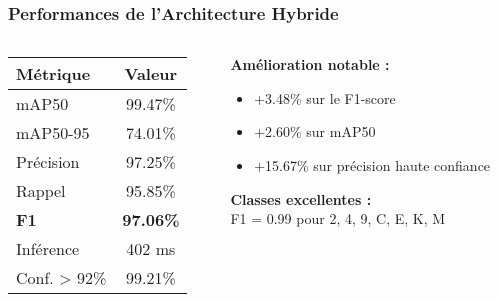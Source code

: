 \documentclass[
	11pt,
	aspectratio=169,
]{beamer}
\begin{document}
\begin{frame}
	\frametitle{Performances de l'Architecture Hybride}
	
	\begin{columns}[c]
		\begin{column}{0.5\textwidth}
			\begin{table}
				\centering
				\begin{tabular}{lc}
					\toprule
					\textbf{Métrique} & \textbf{Valeur} \\
					\midrule
					mAP50 & 99.47\% \\
					mAP50-95 & 74.01\% \\
					Précision & 97.25\% \\
					Rappel & 95.85\% \\
					\textbf{F1} & \textbf{97.06\%} \\
					Inférence & 402 ms \\
					Conf. > 92\% & 99.21\% \\
					\bottomrule
				\end{tabular}
			\end{table}
		\end{column}
		
		\begin{column}{0.5\textwidth}
			\textbf{Amélioration notable :}
			\begin{itemize}
				\item \alert{+3.48\%} sur le F1-score
				\item \alert{+2.60\%} sur mAP50
				\item \alert{+15.67\%} sur précision haute confiance
			\end{itemize}
			
			\bigskip
			
			\textbf{Classes excellentes :}\\
			F1 = 0.99 pour 2, 4, 9, C, E, K, M
		\end{column}
	\end{columns}
\end{frame}

\end{document}
